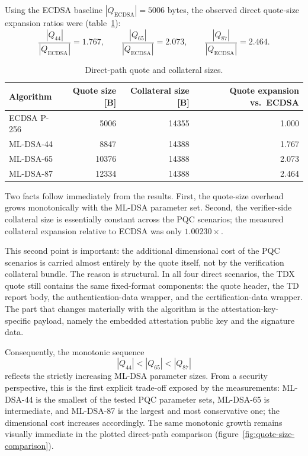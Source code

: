 Using the ECDSA baseline \(|Q_{\mathrm{ECDSA}}| = 5006\) bytes, the observed
direct quote-size expansion ratios were
(table~\ref{tab:direct-dimensional-analysis}):
\[
  \frac{|Q_{44}|}{|Q_{\mathrm{ECDSA}}|} = 1.767,
  \qquad
  \frac{|Q_{65}|}{|Q_{\mathrm{ECDSA}}|} = 2.073,
  \qquad
  \frac{|Q_{87}|}{|Q_{\mathrm{ECDSA}}|} = 2.464.
\]

\begin{table}[t]
\centering
\small
\caption{Direct-path quote and collateral sizes.}
\label{tab:direct-dimensional-analysis}
\begin{tabular}{|l|r|r|r|}
\hline
Algorithm & Quote size [B] & Collateral size [B] & Quote expansion vs.\ ECDSA \\
\hline
ECDSA P-256 & 5006 & 14355 & 1.000 \\
ML-DSA-44 & 8847 & 14388 & 1.767 \\
ML-DSA-65 & 10376 & 14388 & 2.073 \\
ML-DSA-87 & 12334 & 14388 & 2.464 \\
\hline
\end{tabular}
\end{table}

Two facts follow immediately from the results. First, the quote-size overhead
grows monotonically with the ML-DSA parameter set. Second, the verifier-side
collateral size is essentially constant across the PQC scenarios; the measured
collateral expansion relative to ECDSA was only \(1.00230\times\).

This second point is important: the additional dimensional cost of the PQC
scenarios is carried almost entirely by the quote itself, not by the
verification collateral bundle. The reason is structural. In all four direct
scenarios, the TDX quote still contains the same fixed-format components: the
quote header, the TD report body, the authentication-data wrapper, and the
certification-data wrapper. The part that changes materially with the
algorithm is the attestation-key-specific payload, namely the embedded
attestation public key and the signature data.

Consequently, the monotonic sequence
\[
  |Q_{44}| < |Q_{65}| < |Q_{87}|
\]
reflects the strictly increasing ML-DSA parameter sizes. From a security
perspective, this is the first explicit trade-off exposed by the measurements:
ML-DSA-44 is the smallest of the tested PQC parameter sets, ML-DSA-65 is
intermediate, and ML-DSA-87 is the largest and most conservative one; the
dimensional cost increases accordingly. The same monotonic growth remains
visually immediate in the plotted direct-path comparison
(figure~\ref{fig:quote-size-comparison}).

